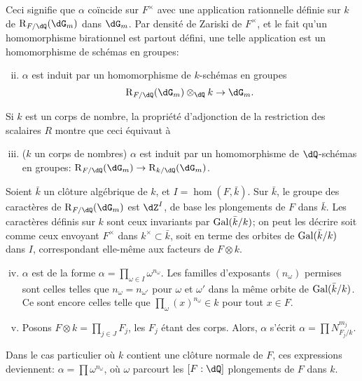 Ceci signifie que $\alpha$ coïncide sur $F^\times$ avec une application 
rationnelle définie sur $k$ de $\res_{F/\dQ}(\dG_m)$ dans $\dG_m$. Par 
densité de Zariski de $F^\times$, et le fait qu'un homomorphisme birationnel 
est partout défini, une telle application est un homomorphisme de schémas 
en groupes: 
\begin{enumerate}[(i)]
\setcounter{enumi}{1}
  \item $\alpha$ est induit par un homomorphisme de $k$-schémas en groupes 
    \[
      \res_{F/\dQ}(\dG_m)\otimes_\dQ k \to \dG_m \text{.} 
    \] 
\end{enumerate}

Si $k$ est un corps de nombre, la propriété d'adjonction de la restriction 
des scalaires $R$ montre que ceci équivaut à 
\begin{enumerate}[(i)]
\setcounter{enumi}{2}
  \item ($k$ un corps de nombres) $\alpha$ est induit par un homomorphisme de 
    $\dQ$-schémas en groupes: $\res_{F/\dQ}(\dG_m) \to \res_{k/\dQ}(\dG_m)$. 
\end{enumerate}

Soient $\bar k$ un clôture algébrique de $k$, et $I=\hom(F,\bar k)$. Sur 
$\bar k$, le groupe des caractères de $\res_{F/\dQ}(\dG_m)$ est $\dZ^I$, de 
base les plongements de $F$ dans $\bar k$. Les caractères définis sur $k$ 
sont ceux invariants par $\operatorname{Gal}(\bar k/k)$; on peut les décrire soit comme 
ceux envoyant $F^\times$ dans $k^\times\subset \bar k$, soit en terme des 
orbites de $\operatorname{Gal}(\bar k/k)$ dans $I$, correspondant elle-même aux facteurs de 
$F\otimes k$. 
\begin{enumerate}[(i)]
\setcounter{enumi}{3}
  \item $\alpha$ est de la forme 
    $\alpha=\prod_{\omega\in I} \omega^{n_\omega}$. Les familles d'exposants 
    $(n_\omega)$ permises sont celles telles que $n_\omega=n_{\omega'}$ pour 
    $\omega$ et $\omega'$ dans la même orbite de $\operatorname{Gal}(\bar k/k)$. Ce sont 
    encore celles telle que $\prod_\omega (x)^{n_\omega}\in k$ pour tout 
    $x\in F$. 
  \item Posons $F\otimes k=\prod_{j\in J} F_j$, les $F_j$ étant des corps. 
    Alors, $\alpha$ s'écrit $\alpha=\prod N_{F_j/k}^{m_j}$. 
\end{enumerate}

Dans le cas particulier où $k$ contient une clôture normale de $F$, ces 
expressions deviennent: $\alpha=\prod \omega^{n_\omega}$, où $\omega$ 
parcourt les $[F:\dQ]$ plongements de $F$ dans $k$. 





